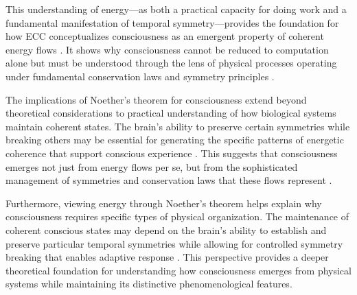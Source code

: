 This understanding of energy—as both a practical capacity for doing work and a fundamental manifestation of temporal symmetry—provides the foundation for how ECC conceptualizes consciousness as an emergent property of coherent energy flows \cite{Feynman1963}. It shows why consciousness cannot be reduced to computation alone but must be understood through the lens of physical processes operating under fundamental conservation laws and symmetry principles \cite{Laughlin2005}.

The implications of Noether's theorem for consciousness extend beyond theoretical considerations to practical understanding of how biological systems maintain coherent states. The brain's ability to preserve certain symmetries while breaking others may be essential for generating the specific patterns of energetic coherence that support conscious experience \cite{Nicolis1977}. This suggests that consciousness emerges not just from energy flows per se, but from the sophisticated management of symmetries and conservation laws that these flows represent \cite{Coopersmith2017}.

Furthermore, viewing energy through Noether's theorem helps explain why consciousness requires specific types of physical organization. The maintenance of coherent conscious states may depend on the brain's ability to establish and preserve particular temporal symmetries while allowing for controlled symmetry breaking that enables adaptive response \cite{Prigogine1978}. This perspective provides a deeper theoretical foundation for understanding how consciousness emerges from physical systems while maintaining its distinctive phenomenological features.